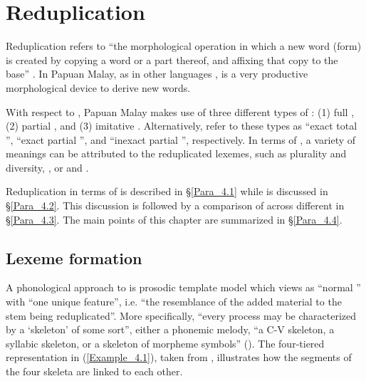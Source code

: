 \chapter[Reduplication]{Reduplication}
\label{Para_4}
Reduplication refers to “the morphological operation in which a new word (form) is created by copying a word or a part thereof, and affixing that copy to the base” \citep[321]{Booij.2007}. In Papuan Malay, as in other  languages \citep[121–125]{Himmelmann.2005},  is a very productive morphological device to derive new words.



With respect to , Papuan Malay makes use of three different types of : (1) full , (2) partial , and (3) imitative . Alternatively, \citet[558]{Wiltshire.1978} refer to these  types as “exact total ”, “exact partial ”, and “inexact partial ”, respectively. In terms of , a variety of meanings can be attributed to the reduplicated lexemes, such as plurality and diversity, , or  and .



Reduplication in terms of  is described in §\ref{Para_4.1}  while  is discussed in §\ref{Para_4.2}. This discussion is followed by a comparison of  across different  in §\ref{Para_4.3}. The main points of this chapter are summarized in §\ref{Para_4.4}.


\section{Lexeme formation}
\largerpage 
\label{Para_4.1}
A phonological approach to  is  pros\-odic template model which views  as “normal ” with “one uniq\-ue feature”, i.e. “the resemblance of the added material to the stem being reduplicated”. More specifically, “every  process may be characterized by a ‘skeleton’ of some sort”, either a phonemic melody, “a C-V skeleton, a syllabic skeleton, or a skeleton of morpheme symbols” (\citeyear*[439]{Marantz.1982}). The four-tiered representation in (\ref{Example_4.1}), taken from {\citet[437]{Marantz.1982}}, illustrates how the segments of the four skeleta are linked to each other.

